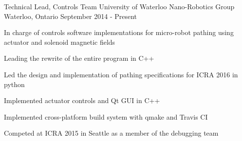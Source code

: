 \begin{cventries}

\cventry
{Technical Lead, Controls Team}
{University of Waterloo Nano-Robotics Group}
{Waterloo, Ontario}
{September 2014 - Present} %
{ %
In charge of controls software implementations for micro-robot pathing using actuator and solenoid magnetic fields
\begin{cvitems}
\item[]
\item {Leading the rewrite of the entire program in C++}
\item {Led the design and implementation of pathing specifications for ICRA 2016 in python}
\item {Implemented actuator controls and Qt GUI in C++}
\item {Implemented cross-platform build system with qmake and Travis CI}
\item {Competed at ICRA 2015 in Seattle as a member of the debugging team}
\end{cvitems} 
}


\end{cventries}

